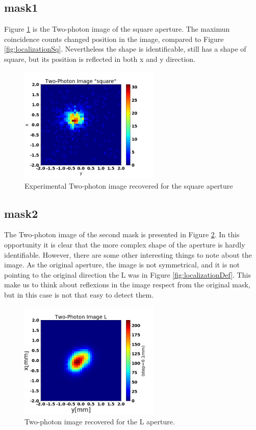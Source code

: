 \subsection{mask1}
Figure \ref{fig:twoPhotonSq} is the Two-photon image of the square aperture. The maximun
coincidence counts changed position in the image, compared to Figure \ref{fig:localizationSq}.
Nevertheless the shape is identificable, still has a shape of square, but its position
is reflected in both x and y direction. 
\begin{figure}[h!]
\centering
\includegraphics[width=0.6\textwidth]{Figures/two-photonImageSq.png} 
\caption{Experimental Two-photon image recovered for the square aperture}
\label{fig:twoPhotonSq}
\end{figure}

\subsection{mask2}
The Two-photon image of the second mask is presented in Figure \ref{fig:twoPhotonL}. 
In this opportunity it is clear that the more complex shape of the aperture is hardly
identifiable. However, there are some other interesting things to note about the image.
As the original aperture, the image is not symmetrical, and it is not pointing to the
original direction the L was in Figure \ref{fig:localizationDef}. This make us to think 
about reflexions in the image respect from the original mask, but in this case is 
not that easy to detect them.
\begin{figure}[h!]
\centering
\includegraphics[width=0.6\textwidth]{Figures/twoPhoL3.png} 
\caption{Two-photon image recovered for the L aperture.}
\label{fig:twoPhotonL}
\end{figure}




